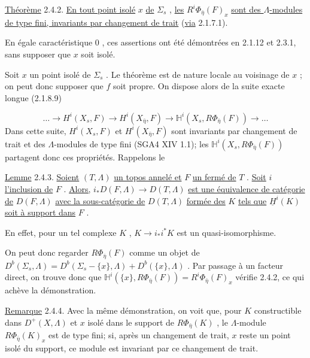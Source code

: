 \underline{Théorème} 2.4.2. \underline{En tout point isolé} $x$ \underline{de} $\Sigma_s$ , \underline{les} $R^i\Phi_{\bar\eta}(F)_x$ \underline{sont des $\Lambda$-modules de type fini, invariants par changement de trait} (\underline{via} 2.1.7.1).

En égale caractéristique $0$ , ces assertions ont été démontrées en 2.1.12 et 2.3.1, sans supposer que $x$ soit isolé.

Soit $x$ un point isolé de $\Sigma_s$ . Le théorème est de nature locale au voisinage de $x$ ; on peut donc supposer que $f$ soit propre. On dispose alors de la suite exacte longue (2.1.8.9)

\begin{equation*}
\dots \longrightarrow H^i(X_s, F) \longrightarrow H^i(X_{\bar\eta}, F) \longrightarrow \mathbb{H}^i(X_s, R\Phi_{\bar\eta}(F)) \longrightarrow \dots
\end{equation*}
Dans cette suite, $H^i(X_s, F)$ et $H^i(X_{\bar\eta}, F)$ sont invariants par changement de trait et des $\Lambda$-modules de type fini (SGA4 XIV 1.1); les $\mathbb{H}^i(X_s, R\Phi_{\bar\eta}(F))$ partagent donc ces propriétés. Rappelons le

\underline{Lemme} 2.4.3. \underline{Soient} $(T, \Lambda)$ \underline{un topos annelé et} $F$ \underline{un fermé de} $T$ . \underline{Soit} $i$ \underline{l'inclusion de} $F$ . \underline{Alors,} $i_* D(F, \Lambda) \longrightarrow D(T, \Lambda)$ \underline{est une équivalence de catégorie de} $D(F, \Lambda)$ \underline{avec la sous-catégorie de} $D(T, \Lambda)$ \underline{formée des} $K$ \underline{tels que} $\underline{H}^i(K)$ \underline{soit à support dans} $F$ .

En effet, pour un tel complexe $K$ , $K \longrightarrow i_*i^*K$ est un quasi-isomorphisme.

On peut donc regarder $R\Phi_{\bar\eta}(F)$ comme un objet de $D^b(\Sigma_s, \Lambda) = D^b(\Sigma_s - \{x\}, \Lambda) + D^b(\{x\}, \Lambda)$ . Par passage à un facteur direct, on trouve donc que $\mathbb{H}^i(\{x\}, R\Phi_{\bar\eta}(F)) = R^i\Phi_{\bar\eta}(F)_x$ vérifie 2.4.2, ce qui achève la démonstration.

\underline{Remarque} 2.4.4. Avec la même démonstration, on voit que, pour $K$ constructible dans $D^+(X, \Lambda)$ et $x$ isolé dans le support de $R\Phi_{\bar\eta}(K)$ , le $\Lambda$-module $R\Phi_{\bar\eta}(K)_x$ est de type fini; si, après un changement de trait, $x$ reste un point isolé du support, ce module est invariant par ce changement de trait.


